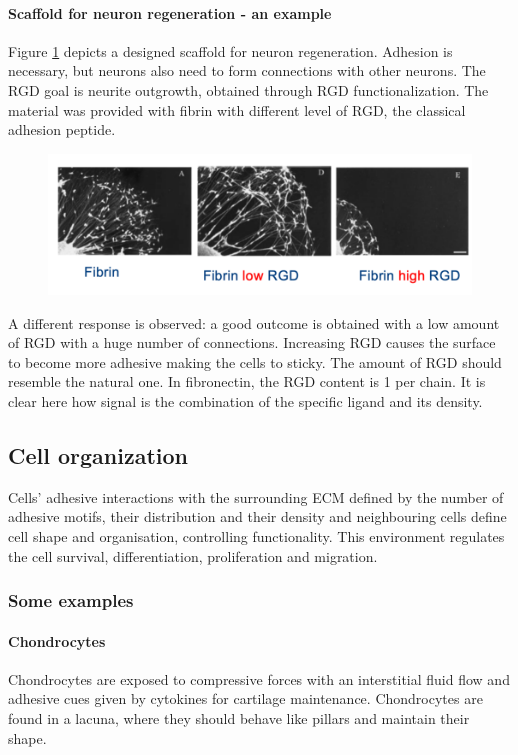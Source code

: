 			\paragraph{Scaffold for neuron regeneration - an example}
			Figure \ref{fig:fibrin} depicts a designed scaffold for neuron regeneration.
			Adhesion is necessary, but neurons also need to form connections with other neurons.
			The RGD goal is neurite outgrowth, obtained through RGD functionalization.
			The material was provided with fibrin with different level of RGD, the classical adhesion peptide.

			\begin{figure}[h]
				\includegraphics[width=1\textwidth]{fibrin}
				\caption{\label{fig:fibrin}}
			\end{figure}

			A different response is observed: a good outcome is obtained with a low amount of RGD with a huge number of connections.
			Increasing RGD causes the surface to become more adhesive making the cells to sticky.
			The amount of RGD should resemble the natural one.
			In fibronectin, the RGD content is 1 per chain.
			It is clear here how signal is the combination of the specific ligand and its density.


	\subsection{Cell organization}
	Cells' adhesive interactions with the surrounding ECM defined by the number of adhesive motifs, their distribution and their density and neighbouring cells define cell shape and organisation, controlling functionality.
	This environment regulates the cell survival, differentiation, proliferation and migration.

		\subsubsection{Some examples}

			\paragraph{Chondrocytes}
			Chondrocytes are exposed to compressive forces with an interstitial fluid flow and adhesive cues given by cytokines for cartilage maintenance.
			Chondrocytes are found in a lacuna, where they should behave like pillars and maintain their shape.

